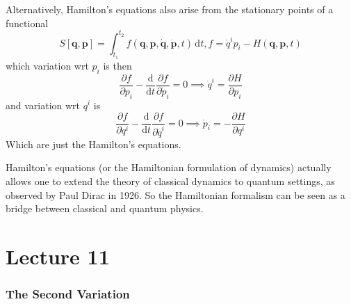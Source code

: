 \documentclass{article}
\begin{document}
Alternatively, Hamilton's equations also arise from the stationary points of a functional
$$S[\mathbf{q},\mathbf{p}]=\int_{t_1}^{t_2}f(\mathbf{q},\mathbf{p},\mathbf{\dot{q}},\mathbf{\dot{p}},t)\,\mathrm dt,f=\dot{q}^ip_i-H(\mathbf{q},\mathbf{p},t)$$
which variation wrt $p_i$ is then
$$\frac{\partial f}{\partial p_i}-\frac{\mathrm d}{\mathrm dt}\frac{\partial f}{\partial \dot{p}_i}=0\implies \dot{q}^i=\frac{\partial H}{\partial p_i}$$
and variation wrt $q^i$ is
$$\frac{\partial f}{\partial q^i}-\frac{\mathrm d}{\mathrm dt}\frac{\partial f}{\partial \dot{q}^i}=0\implies \dot{p}_i=-\frac{\partial H}{\partial q^i}$$
Which are just the Hamilton's equations.

Hamilton's equations (or the Hamiltonian formulation of dynamics) actually allows one to extend the theory of classical dynamics to quantum settings, as observed by Paul Dirac in 1926.
So the Hamiltonian formalism can be seen as a bridge between classical and quantum physics.
\newpage
\part*{Lecture 11}

\section{The Second Variation}
\end{document}
